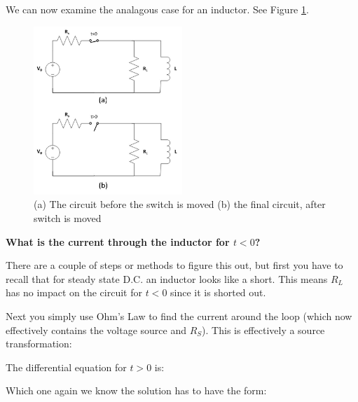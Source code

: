 \documentclass{handout}
\begin{document}
\newpage
\clearpage
\pagebreak

We can now examine the analagous case for an inductor.  See Figure \ref{fig: DischargingInductorCircuit}.

\begin{figure} [h!]
\centering
\includegraphics[width=0.5\textwidth]{DischargingInductorCircuit.jpg}
\caption{(a) The circuit before the switch is moved (b) the final circuit, after switch is moved}
\label{fig: DischargingInductorCircuit}
\end{figure}

\textbf{What is the current through the inductor for $t<0$?}

There are a couple of steps or methods to figure this out, but first you have to recall that for steady state D.C. an inductor looks like a short.  This means $R_L$ has no impact on the circuit for $t<0$ since it is shorted out.

Next you simply use Ohm's Law to find the current around the loop (which now effectively contains the voltage source and $R_S$).  This is effectively a source transformation:

The differential equation for $t>0$ is:
\soln{0.5in}{
\[
\frac{\partial i_L(t)}{\partial t} + \frac{R_L}{L}  i_L(t)=0
\]
}

Which one again we know the solution has to have the form:
\end{document}
